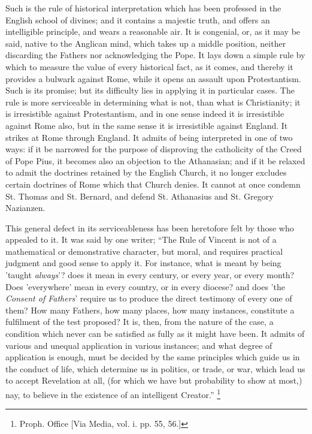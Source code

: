 Such is the rule of historical interpretation which
has been professed in the English school of divines; and
it contains a majestic truth, and offers an intelligible
principle, and wears a reasonable air. It is congenial,
or, as it may be said, native to the Anglican mind, which
takes up a middle position, neither discarding the
Fathers nor acknowledging the Pope. It lays down a simple
rule by which to measure the value of every historical
fact, as it comes, and thereby it provides a bulwark
against Rome, while it opens an assault upon
Protestantism. Such is its promise; but its difficulty
lies in applying it in particular cases. The rule is more
serviceable in determining what is not, than what is
Christianity; it is irresistible against Protestantism,
and in one sense indeed it is irresistible against Rome
also, but in the same sense it is irresistible against
England. It strikes at Rome through England. It admits of
being interpreted in one of two ways: if it be narrowed
for the purpose of disproving the catholicity of the
Creed of Pope Pius, it becomes also an objection to the
Athanasian; and if it be relaxed to admit the doctrines
retained by the English Church, it no longer excludes
certain doctrines of Rome which that Church denies. It
cannot at once condemn St. Thomas and St. Bernard, and
defend St. Athanasius and St. Gregory Nazianzen.

This general defect in its serviceableness has been
heretofore felt by those who appealed to it. It was said
by one writer; ``The Rule of Vincent is not of a
mathematical or demonstrative character, but moral, and
requires practical judgment and good sense to apply it.
For instance, what is meant by being 'taught \emph{always}'?
does it mean in every century, or every year, or every
month? Does 'everywhere' mean in every country, or in
every diocese? and does 'the \emph{Consent of Fathers}'
require us to produce the direct testimony of every one
of them? How many Fathers, how many places, how many
instances, constitute a fulfilment of the test proposed?
It is, then, from the nature of the case, a condition
which never can be satisfied as fully as it might have
been. It admits of various and unequal application in
various instances; and what degree of application is
enough, must be decided by the same principles which
guide us in the conduct of life, which determine us in
politics, or trade, or war, which lead us to accept
Revelation at all, (for which we have but probability to
show at most,) nay, to believe in the existence of an
intelligent Creator.'' \footnote{Proph. Office [Via Media, vol.
i. pp. 55, 56.]}

